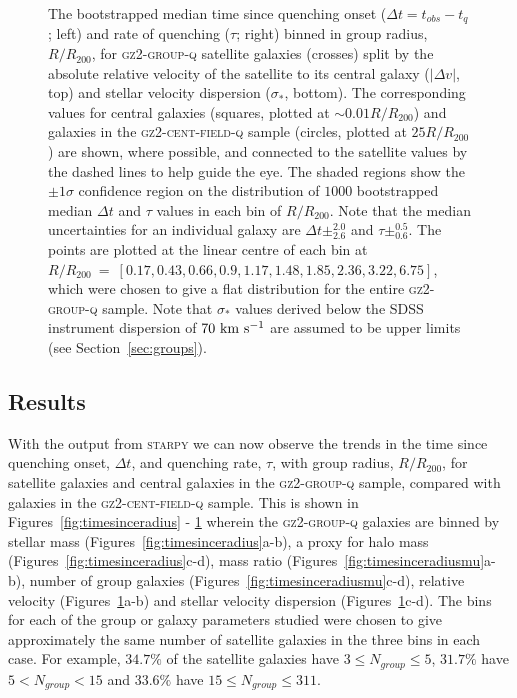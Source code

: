 \documentclass[useAMS,usenatbib]{mn2e}
\begin{document}
\begin{figure}
{\caption[Trend of $\Delta t$ and $\tau$ with group radius split by relative velocity and stellar velocity dispersion]{The bootstrapped median time since quenching onset ($\Delta t = t_{obs} - t_{q}$; left) and rate of quenching ($\tau$; right) binned in group radius, $R/R_{200}$, for \textsc{gz2-group-q} satellite galaxies (crosses) split by the absolute relative velocity of the satellite to its central galaxy ($|\Delta v|$, top) and stellar velocity dispersion ($\sigma_*$, bottom). The corresponding values for central galaxies (squares, plotted at $\sim0.01 R/R_{200}$) and galaxies in the \textsc{gz2-cent-field-q} sample (circles, plotted at $25 R/R_{200}$) are shown, where possible, and connected to the satellite values by the dashed lines to help guide the eye. The shaded regions show the $\pm1\sigma$ confidence region on the distribution of $1000$ bootstrapped median $\Delta t$ and $\tau$ values in each bin of $R/R_{200}$. Note that the median uncertainties for an individual galaxy are $\Delta t\pm_{2.6}^{2.0}$ and $\tau\pm_{0.6}^{0.5}$. The points are plotted at the linear centre of each bin at $R/R_{200}~=~ [0.17,  0.43,  0.66,  0.9 ,  1.17,  1.48,  1.85,  2.36,  3.22,  6.75]$, which were chosen to give a flat distribution for the entire \textsc{gz2-group-q} sample. Note that $\sigma_*$ values derived below the SDSS instrument dispersion of $70~\rm{km}~\rm{s}^{-1}$ are assumed to be upper limits (see Section~\ref{sec:groups}).}
\label{fig:timesinceradiusvel}}
\end{figure}


\subsection{Results}\label{sec:resultssfhs}

With the output from \textsc{starpy} we can now observe the trends in the time since quenching onset, $\Delta t$, and quenching rate, $\tau$, with group radius, $R/R_{200}$, for satellite galaxies and central galaxies in the \textsc{gz2-group-q} sample, compared with galaxies in the \textsc{gz2-cent-field-q} sample. This is shown in Figures~\ref{fig:timesinceradius} - \ref{fig:timesinceradiusvel} wherein the \textsc{gz2-group-q} galaxies are binned by stellar mass (Figures~\ref{fig:timesinceradius}a-b), a proxy for halo mass (Figures~\ref{fig:timesinceradius}c-d), mass ratio (Figures~\ref{fig:timesinceradiusmu}a-b), number of group galaxies (Figures~\ref{fig:timesinceradiusmu}c-d), relative velocity (Figures~\ref{fig:timesinceradiusvel}a-b) and stellar velocity dispersion (Figures~\ref{fig:timesinceradiusvel}c-d). The bins for each of the group or galaxy parameters studied were chosen to give approximately the same number of satellite galaxies in the three bins in each case. For example, $34.7\%$ of the satellite galaxies have $3 \leq N_{group} \leq 5$, $31.7\%$ have $5 < N_{group} < 15$ and $33.6\%$ have $15 \leq N_{group} \leq 311$. 
\end{document}

